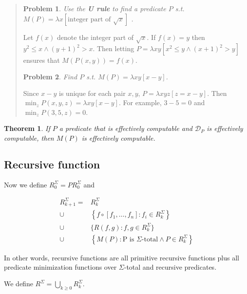 \documentclass[a4paper, 12pt]{article}
\newtheorem{problem}{Problem}
\newtheorem{theorem}{Theorem}
\newtheorem{problem}{Problem}
\newtheorem{theorem}{Theorem}
\begin{document}
\small
\begin{quote}


\begin{problem}
    Use the \textbf{U rule} to find a predicate $P$ s.t. $M(P) = \lambda
    x[\text{integer part of } \sqrt{x}]$ .
\end{problem}

Let $f(x)$ denote the integer part of $\sqrt{x}$. If $f(x) = y$ then $y^2 \leq x
\land (y+1)^2 > x$. Then letting $P = \lambda xy\left[ x^2 \leq y \land (x +
1)^2 > y \right] $ ensures that $M(P(x, y)) = f(x)$.

\begin{problem}
    Find $P$ s.t. $M(P) = \lambda xy\left[ x - y \right] $.
\end{problem}

Since $x - y$ is unique for each pair $x, y$, $P = \lambda xyz [z = x - y]$. Then
$\min_z P(x, y, z) = \lambda xy[x - y]$. For example, $3 - 5 = 0$ and $\min_z
P(3, 5, z) = 0$.

\end{quote}
\normalsize


\begin{theorem}
    If $P$ a predicate that is effectively computable and $\mathcal{D}_P$ is
    effectively computable, then $M(P)$ is effectively computable.
\end{theorem}

\subsection{Recursive function}

Now we define $R_0^{\Sigma} = PR_0^{\Sigma}$ and 

\begin{align*}
    R_{k+1}^{\Sigma} = &R_k^{\Sigma} \\ \cup &\left\{ f \circ \left[ f_1, \ldots,
    f_n \right] : f_i \in R_{k}^{\Sigma} \right\} \\ \cup &\{R(f, g) : f, g \in
R_k^{\Sigma}\} \\ \cup & \left\{M(P) : \text{P is $\Sigma$-total} \land P \in
R_k^{\Sigma}\right\}
\end{align*}

In other words, recursive functions are all primitive recursive functions plus
all predicate minimization functions over $\Sigma$-total and recursive
predicates.

We define $R^{\Sigma} = \bigcup_{k\geq 0} R_{k}^{\Sigma}$.
\end{document}
